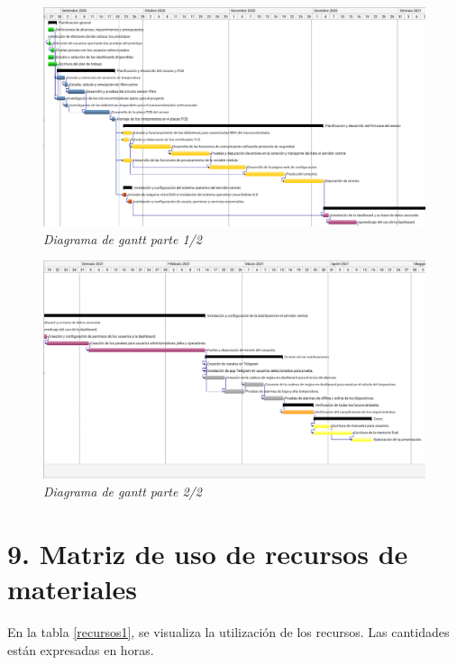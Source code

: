 \documentclass[11pt]{charter}
\begin{document}
\begin{landscape}
\begin{figure}[htpb]
\centering 
\includegraphics[width=1.5\textwidth]{./Figuras/gantt1.png}
\vspace{-0.3cm} 
\caption{\textit{Diagrama de gantt parte 1/2}}
\label{gantt1}
\end{figure}
\end{landscape}

\begin{landscape}
\begin{figure}[htpb]
\centering 
\includegraphics[width=1.5\textwidth]{./Figuras/gantt2.png}
\vspace{-0.3cm} 
\caption{\textit{Diagrama de gantt parte 2/2}}
\label{gantt2}
\end{figure}
 \end{landscape}



\section{9. Matriz de uso de recursos de materiales}
\label{sec:recursos}
En la tabla \ref{recursos1}, se visualiza la utilización de los recursos. Las cantidades están expresadas en horas.
\end{document}
